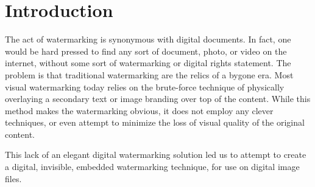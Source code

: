\section{Introduction}\label{sec:intro}
The act of watermarking is synonymous with digital documents.
In fact, one would be hard pressed to find any sort of document, photo, or video on the internet, without some sort of watermarking or digital rights statement.
The problem is that traditional watermarking are the relics of a bygone era.
Most visual watermarking today relies on the brute-force technique of physically overlaying a secondary text or image branding over top of the content.
While this method makes the watermarking obvious, it does not employ any clever techniques, or even attempt to minimize the loss of visual quality of the original content.

This lack of an elegant digital watermarking solution led us to attempt to create a digital, invisible, embedded watermarking technique, for use on digital image files.
